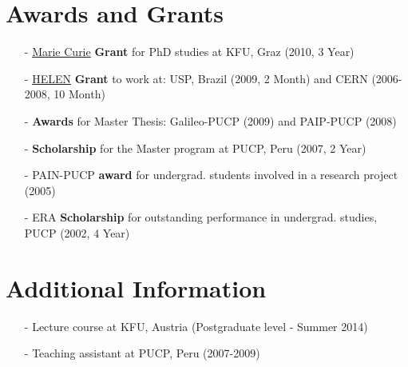 \documentclass[a4paper, 10pt]{article}
\begin{document}
\section{Awards and Grants}
\vspace*{2mm}
\begin{itemize}
    \item[-] \href{http://www.physik.uni-regensburg.de/STRONGnet/index.php?pg=home}{Marie Curie}
    \textbf{Grant} for PhD studies at KFU, Graz (2010, 3 Year)
    \vspace*{-1mm}

    \item[-] \href{http://www.roma1.infn.it/exp/helen/}{HELEN} 
    \textbf{Grant} to work at: USP, Brazil (2009, 2 Month) and CERN (2006-2008, 10 Month)
    \vspace*{-1mm}

    \item[-] {\bf Awards} for Master Thesis: Galileo-PUCP (2009) and PAIP-PUCP (2008)
    \vspace*{-1mm}
 
    \item[-] \textbf{Scholarship} for the Master program at PUCP, Peru (2007, 2 Year)
    \vspace*{-1mm}
    
    \item[-] PAIN-PUCP \textbf{award} for undergrad. students involved in a research project (2005)
    \vspace*{-1mm}
    
    \item[-] ERA \textbf{Scholarship} for outstanding performance in undergrad. studies, PUCP (2002, 4 Year)
\end{itemize}


\vspace*{4mm}
\section{Additional Information}
\vspace*{2mm}
\vspace*{-1mm}
\begin{itemize}
    \item[-] Lecture course at  KFU, Austria (Postgraduate level - Summer 2014)\vspace*{-2mm}
    \item[-] Teaching assistant at PUCP, Peru (2007-2009)
\end{itemize}
\end{document}
